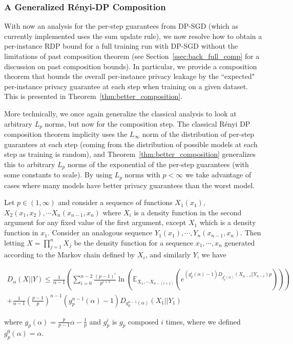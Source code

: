 \subsubsection{A Generalized R\'enyi-DP Composition}
\label{ssec:comp}




With now an analysis for the per-step guarantees from DP-SGD (which as currently implemented uses the sum update rule), we now resolve how to obtain a per-instance RDP bound for a full training run with DP-SGD without the limitations of past composition theorem (see Section~\ref{ssec:back_full_comp} for a discussion on past composition bounds). In particular, we provide a composition theorem that bounds the overall per-instance privacy leakage by the ``expected" per-instance privacy guarantee at each step when training on a given dataset. This is presented in Theorem~\ref{thm:better_composition}.


More technically, we once again generalize the classical analysis to look at arbitrary $L_p$ norms, but now for the composition step. The classical R\'enyi DP composition theorem implicity uses the $L_\infty$ norm of the distribution of per-step guarantees at each step (coming from the distribution of possible models at each step as training is random), and Theorem~\ref{thm:better_composition} generalizes this to arbitrary $L_p$ norms of the exponential of the per-step guarantees (with some constants to scale). By using $L_p$ norms with $p < \infty$ we take advantage of cases where many models have better privacy guarantees than the worst model. 




\begin{theorem}
\label{thm:better_composition}

    Let $p \in (1,\infty)$ and consider a sequence of functions $X_1(x_1),$ $X_2(x_1,x_2),\cdots X_n(x_{n-1},x_n)$ where $X_{i}$ is a density function in the second argument for any fixed value of the first argument, except $X_1$ which is a density function in $x_1$. Consider an analogous sequence $Y_1(x_1),\cdots, Y_n(x_{n-1}, x_n)$. Then letting $X = \prod_{j=1}^{n} X_j$ be the density function for a sequence $x_1,\cdots,x_n$ generated according to the Markov chain defined by $X_i$, and similarly $Y$, we have 
    
    
    \begin{multline}
        D_{\alpha}(X || Y)  \leq \frac{1}{\alpha -1} (\sum_{i=0}^{n-2} \frac{(p-1)^i}{p^{i+1}} \ln (\mathbb{E}_{X_1,\cdots X_{n-(i+1)}}  (e^{(g_p^{i}(\alpha) -1)D_{g_p^{i}(\alpha)}(X_{n-i}|| Y_{n-i})p}))) \\ + \frac{1}{\alpha -1} (\frac{p-1}{p})^{n-1} (g_p^{n-1}(\alpha) -1)D_{g_p^{n-1}(\alpha)}(X_{1}|| Y_{1}) 
    \end{multline}


    where $g_p(\alpha) = \frac{p}{p-1} \alpha - \frac{1}{p}$ and $g_p^{i}$ is $g_p$ composed $i$ times, where we defined $g_p^{0}(\alpha) = \alpha$.
\end{theorem}

